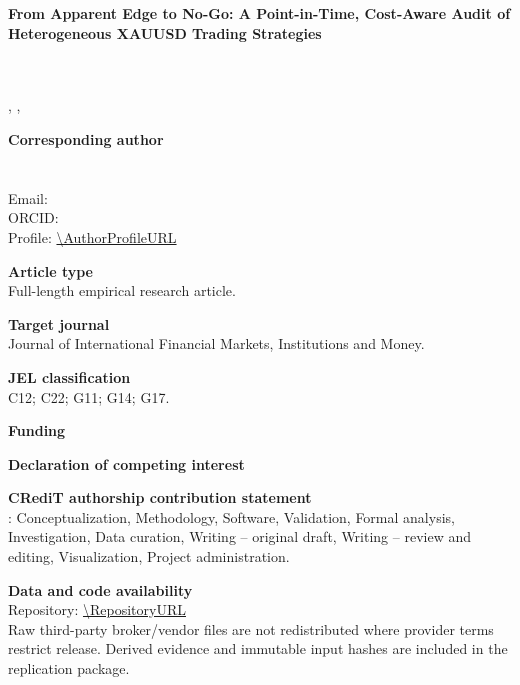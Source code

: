 \documentclass[11pt,a4paper]{article}
\begin{document}
\thispagestyle{empty}
\begin{center}
{\Large\bfseries From Apparent Edge to No-Go: A Point-in-Time, Cost-Aware Audit of Heterogeneous XAUUSD Trading Strategies\par}
\vspace{1.5cm}
{\large \AuthorName\par}
{\normalsize \AuthorTitle\par}
\vspace{0.4cm}
\AffiliationOrganization\\
\AffiliationAddress\\
\AffiliationCity, \AffiliationPostcode, \AffiliationCountry
\end{center}

\vspace{1cm}
\textbf{Corresponding author}\\
\AuthorName\\
\AuthorTitle\\
Email: \AuthorEmail\\
\if\relax\detokenize\expandafter{\AuthorORCID}\relax\else ORCID: \AuthorORCID\\\fi
\if\relax\detokenize\expandafter{\AuthorProfileURL}\relax\else Profile: \expandafter\url\expandafter{\AuthorProfileURL}\fi

\textbf{Article type}\\
Full-length empirical research article.

\textbf{Target journal}\\
Journal of International Financial Markets, Institutions and Money.

\textbf{JEL classification}\\
C12; C22; G11; G14; G17.

\textbf{Funding}\\
\FundingStatement

\textbf{Declaration of competing interest}\\
\InterestStatement

\textbf{CRediT authorship contribution statement}\\
\AuthorName: Conceptualization, Methodology, Software, Validation, Formal analysis, Investigation, Data curation, Writing -- original draft, Writing -- review and editing, Visualization, Project administration.

\textbf{Data and code availability}\\
Repository: \expandafter\url\expandafter{\RepositoryURL}\\
Raw third-party broker/vendor files are not redistributed where provider terms restrict release. Derived evidence and immutable input hashes are included in the replication package.
\end{document}
